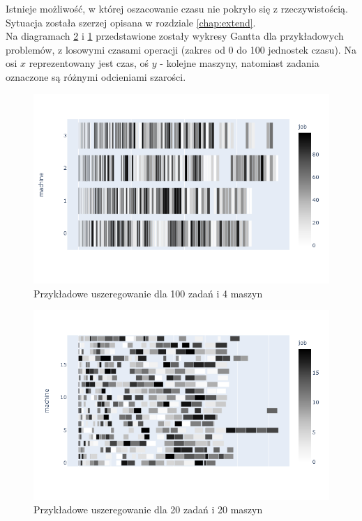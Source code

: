\documentclass[brudnopis]{xmgr}
\begin{document}
Istnieje możliwość, w której oszacowanie czasu nie pokryło się z rzeczywistością. Sytuacja została szerzej opisana w rozdziale \ref{chap:extend}.\\

Na diagramach \ref{diag:sched_20j420} i \ref{diag:sched_100j4m} przedstawione zostały wykresy Gantta dla przykładowych problemów, z losowymi czasami operacji (zakres od 0 do 100 jednostek czasu). Na osi $x$ reprezentowany jest czas, oś $y$ - kolejne maszyny, natomiast zadania oznaczone są różnymi odcieniami szarości.

\begin{figure}[!tbh]
\centering
\includegraphics[width=.8\hsize]{fig/newplot_trim100j4m.png}
\caption{Przykładowe uszeregowanie dla 100 zadań i 4 maszyn\label{diag:sched_100j4m}}
\end{figure}
\medskip

\begin{figure}[!tbh]
\centering
\includegraphics[width=.8\hsize]{fig/newplot_trim20j20m.png}
\caption{Przykładowe uszeregowanie dla 20 zadań i 20 maszyn\label{diag:sched_20j420}}
\end{figure}
\medskip
\end{document}
